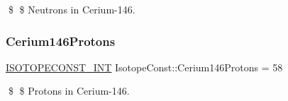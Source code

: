 \$ \$ Neutrons in Cerium-\/146. \mbox{\label{group___isotope_const-_cerium-_ce146_ga4cf0d0d670c3befb40b872a09ac5d03e}} 
\subsubsection{\texorpdfstring{Cerium146\+Protons}{Cerium146Protons}}
{\footnotesize\ttfamily \mbox{\hyperlink{group___isotope_const-_macros_ga5f18360b3e99483a35c32d789e62621c}{I\+S\+O\+T\+O\+P\+E\+C\+O\+N\+S\+T\+\_\+\+I\+NT}} Isotope\+Const\+::\+Cerium146\+Protons = 58}

\$ \$ Protons in Cerium-\/146. 